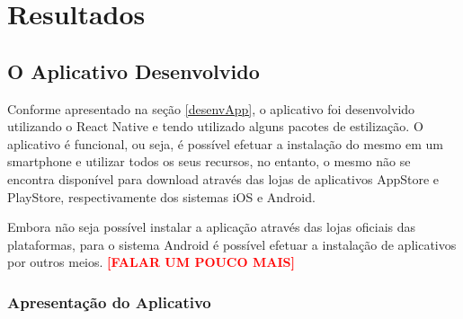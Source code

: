 \chapter{Resultados}

\section{O Aplicativo Desenvolvido}

Conforme apresentado na seção \ref{desenvApp}, o aplicativo foi desenvolvido utilizando o React Native e tendo utilizado alguns pacotes de estilização. O aplicativo é funcional, ou seja, é possível efetuar a instalação do mesmo em um smartphone e utilizar todos os seus recursos, no entanto, o mesmo não se encontra disponível para download através das lojas de aplicativos AppStore e PlayStore, respectivamente dos sistemas iOS e Android.

Embora não seja possível instalar a aplicação através das lojas oficiais das plataformas, para o sistema Android é possível efetuar a instalação de aplicativos por outros meios. \textbf{\textcolor{red}{[FALAR UM POUCO MAIS]}}

\subsection{Apresentação do Aplicativo}

